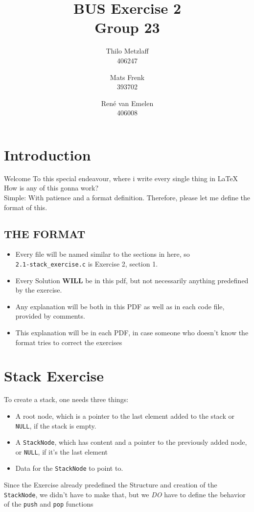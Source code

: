 \documentclass[a4paper, 11pt]{article}
\author{Thilo Metzlaff\\406247 \and Mats Frenk\\393702\and René van Emelen\\406008}
\title{BUS Exercise 2 \\ \Large Group 23}
\begin{document}
    \maketitle
    \newpage

    \tableofcontents
    \newpage

    \section{Introduction}
    Welcome To this special endeavour, where i write every single thing in \LaTeX{}
    How is any of this gonna work?\\
    Simple: With patience and a format definition. Therefore, please let me define the format of this.

    \subsection*{THE FORMAT}
    \begin{itemize}
        \item Every file will be named similar to the sections in here, so\\
              \texttt{2.1-stack\_exercise.c} is Exercise 2, section 1.
        \item Every Solution \textbf{WILL} be in this pdf, but not necessarily 
              anything predefined by the exercise.
        \item Any explanation will be both in this PDF as well as in each code file, 
              provided by comments.
        \item This explanation will be in each PDF, in case someone who doesn't
              know the format tries to correct the exercises
    \end{itemize}
    \newpage

    \section{Stack Exercise}
    To create a stack, one needs three things:
    \begin{itemize}
        \item A root node, which is a pointer to the last element added
              to the stack or \lstinline{NULL}, if the stack is empty.
        \item A \texttt{StackNode}, which has content and a pointer to the previously 
              added node, or \lstinline{NULL}, if it's the last element
        \item Data for the \texttt{StackNode} to point to.
    \end{itemize}
    Since the Exercise already predefined the Structure and creation of the \texttt{StackNode}, 
    we didn't have to make that, but we \emph{DO} have to define the behavior of the \texttt{push} and
    \texttt{pop} functions
\end{document}
